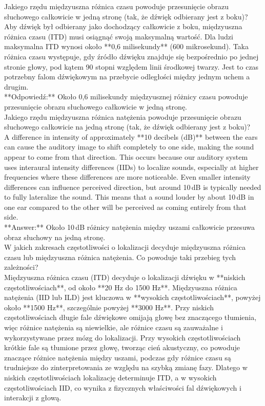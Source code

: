 \documentclass{article}
\begin{document}
Jakiego rzędu międzyuszna różnica czasu powoduje przesunięcie obrazu słuchowego całkowicie w jedną stronę (tak, że dźwięk odbierany jest z boku)? \\
Aby dźwięk był odbierany jako dochodzący całkowicie z boku, międzyuszna różnica czasu (ITD) musi osiągnąć swoją maksymalną wartość. Dla ludzi maksymalna ITD wynosi około **0,6 milisekundy** (600 mikrosekund). Taka różnica czasu występuje, gdy źródło dźwięku znajduje się bezpośrednio po jednej stronie głowy, pod kątem 90 stopni względem linii środkowej twarzy. Jest to czas potrzebny falom dźwiękowym na przebycie odległości między jednym uchem a drugim. \\
**Odpowiedź:** Około 0,6 milisekundy międzyusznej różnicy czasu powoduje przesunięcie obrazu słuchowego całkowicie w jedną stronę. \\
Jakiego rzędu międzyuszna różnica natężenia powoduje przesunięcie obrazu słuchowego całkowicie na jedną stronę (tak, że dźwięk odbierany jest z boku)? \\
A difference in intensity of approximately **10 decibels (dB)** between the ears can cause the auditory image to shift completely to one side, making the sound appear to come from that direction. This occurs because our auditory system uses interaural intensity differences (IIDs) to localize sounds, especially at higher frequencies where these differences are more noticeable. Even smaller intensity differences can influence perceived direction, but around 10 dB is typically needed to fully lateralize the sound. This means that a sound louder by about 10 dB in one ear compared to the other will be perceived as coming entirely from that side. \\
**Answer:** Około 10 dB różnicy natężenia między uszami całkowicie przesuwa obraz słuchowy na jedną stronę. \\
W jakich zakresach częstotliwości o lokalizacji decyduje międzyuszna różnica czasu lub międzyuszna różnica natężenia. Co powoduje taki przebieg tych zależności? \\
Międzyuszna różnica czasu (ITD) decyduje o lokalizacji dźwięku w **niskich częstotliwościach**, od około **20 Hz do 1500 Hz**. Międzyuszna różnica natężenia (IID lub ILD) jest kluczowa w **wysokich częstotliwościach**, powyżej około **1500 Hz**, szczególnie powyżej **3000 Hz**. Przy niskich częstotliwościach długie fale dźwiękowe omijają głowę bez znaczącego tłumienia, więc różnice natężenia są niewielkie, ale różnice czasu są zauważalne i wykorzystywane przez mózg do lokalizacji. Przy wysokich częstotliwościach krótkie fale są tłumione przez głowę, tworząc cień akustyczny, co powoduje znaczące różnice natężenia między uszami, podczas gdy różnice czasu są trudniejsze do zinterpretowania ze względu na szybką zmianę fazy. Dlatego w niskich częstotliwościach lokalizację determinuje ITD, a w wysokich częstotliwościach IID, co wynika z fizycznych właściwości fal dźwiękowych i interakcji z głową. \\
\end{document}
